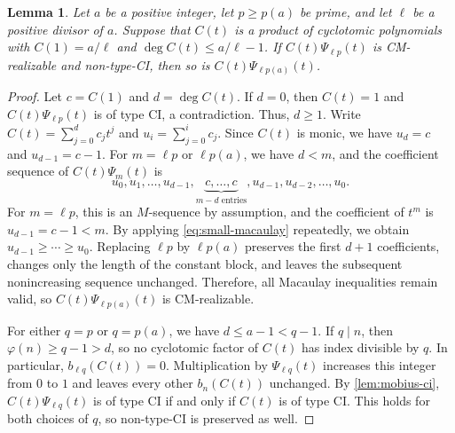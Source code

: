 \documentclass[11pt,a4paper]{amsart}
\newtheorem{lemma}[lemma]{Lemma}
\theoremstyle{definition}
\theoremstyle{remark}
\newcommand{\ph}{\varphi}
\begin{document}
\begin{lemma}\label{lem:replace-prime-general}
Let $a$ be a positive integer, let $p\ge p(a)$ be prime, and let $\ell$ be a positive divisor of $a$. Suppose that $C(t)$ is a product of cyclotomic polynomials with $C(1)=a/\ell$ and $\deg C(t)\le a/\ell-1$. If $C(t)\Psi_{\ell p}(t)$ is CM-realizable and non-type-CI, then so is $C(t)\Psi_{\ell p(a)}(t)$.
\end{lemma}
\begin{proof}
Let $c=C(1)$ and $d=\deg C(t)$. If $d=0$, then $C(t)=1$ and $C(t)\Psi_{\ell p}(t)$ is of type CI, a contradiction. Thus, $d\ge1$. Write $C(t)=\sum_{j=0}^d c_jt^j$ and $u_i=\sum_{j=0}^i c_j$. Since $C(t)$ is monic, we have $u_d=c$ and $u_{d-1}=c-1$. For $m=\ell p$ or $\ell p(a)$, we have $d<m$, and the coefficient sequence of $C(t)\Psi_m(t)$ is
\[u_0,u_1,\ldots,u_{d-1},\underbrace{c,\ldots,c}_{m-d\text{ entries}},u_{d-1},u_{d-2},\ldots,u_0.\]
For $m=\ell p$, this is an $M$-sequence by assumption, and the coefficient of $t^m$ is $u_{d-1}=c-1<m$. By applying \eqref{eq:small-macaulay} repeatedly, we obtain $u_{d-1}\ge\cdots\ge u_0$. Replacing $\ell p$ by $\ell p(a)$ preserves the first $d+1$ coefficients, changes only the length of the constant block, and leaves the subsequent nonincreasing sequence unchanged. Therefore, all Macaulay inequalities remain valid, so $C(t)\Psi_{\ell p(a)}(t)$ is CM-realizable.

For either $q=p$ or $q=p(a)$, we have $d\le a-1<q-1$. If $q\mid n$, then $\ph(n)\ge q-1>d$, so no cyclotomic factor of $C(t)$ has index divisible by $q$. In particular, $b_{\ell q}(C(t))=0$. Multiplication by $\Psi_{\ell q}(t)$ increases this integer from $0$ to $1$ and leaves every other $b_n(C(t))$ unchanged. By \cref{lem:mobius-ci}, $C(t)\Psi_{\ell q}(t)$ is of type CI if and only if $C(t)$ is of type CI. This holds for both choices of $q$, so non-type-CI is preserved as well.
\end{proof}
\end{document}
